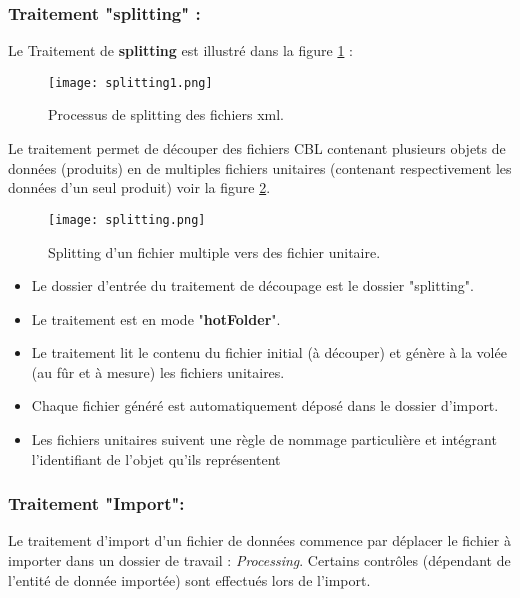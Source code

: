 \subsubsection{Traitement "splitting" :}

Le Traitement de \textbf{splitting} est illustré dans la figure \ref{fig:splitting1} :

\begin{figure}[ht]
  \centering
  \texttt{[image: splitting1.png]}
  \caption{Processus de splitting des fichiers xml.}
  \label{fig:splitting1}
\end{figure}
\FloatBarrier

Le traitement permet de découper des fichiers CBL contenant plusieurs objets de données (produits) en de multiples fichiers unitaires (contenant respectivement les données d'un seul produit) voir la figure \ref{fig:splitting}.
\medskip

\begin{figure}[ht]
  \centering
  \texttt{[image: splitting.png]}
  \caption{Splitting d'un fichier multiple vers des fichier unitaire.}
  \label{fig:splitting}
\end{figure}
\FloatBarrier

\begin{itemize}
    \item Le dossier d'entrée du traitement de découpage est le dossier "splitting".
    \medskip
    \item Le traitement est en mode "\textbf{hotFolder}".
    \medskip
    \item Le traitement lit le contenu du fichier initial (à découper) et génère à la volée (au fûr et à mesure) les fichiers unitaires.
    \medskip
    \item Chaque fichier généré est automatiquement déposé dans le dossier d'import.
    \medskip
    \item Les fichiers unitaires suivent une règle de nommage particulière et intégrant l'identifiant de l'objet qu'ils représentent
\end{itemize}

\subsubsection{Traitement "Import":}

Le traitement d'import d'un fichier de données commence par déplacer le fichier à importer dans un dossier de travail : \textit{Processing}. Certains contrôles (dépendant de l'entité de donnée importée) sont effectués lors de l'import.
\medskip

